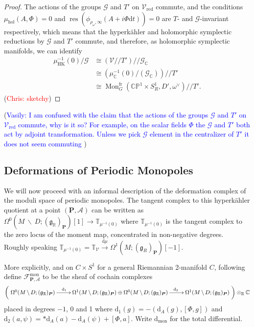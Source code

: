 \documentclass[11pt, oneside, reqno]{amsart}
\theoremstyle{definition} \newtheorem{definition}{Definition}[section]
\theoremstyle{definition} \newtheorem{remark}[definition]{Remark}
\theoremstyle{definition} \newtheorem{remarks}[definition]{Remarks}
\theoremstyle{definition} \newtheorem{question}[definition]{Question}
\theoremstyle{definition} \newtheorem*{note}{Note}
\theoremstyle{definition} \newtheorem{example}[definition]{Example}
\theoremstyle{definition} \newtheorem{examples}[definition]{Examples}
\renewcommand{\gg}{\mathfrak{g}}
\newcommand{\bb}[1]{\mathbb{#1}}
\newcommand{\mr}[1]{\mathrm{#1}}
\newcommand{\mc}[1]{\mathcal{#1}}
\newcommand{\bo}[1]{\boldsymbol{#1}}
\newcommand{\bs}{\ \backslash \ }
\newcommand{\CC}{\mathbb{C}}
\newcommand{\RR}{\mathbb{R}}
\newcommand{\iso}{\cong}
\DeclareMathOperator{\res}{res}
\DeclareMathOperator{\mon}{Mon}
\renewcommand{\d}{\mathrm{d}}
\newcommand{\fr}{\mathrm{fr}}
\newcommand{\chris}[1]{(\textcolor{red}{Chris: #1})}
\newcommand{\vasily}[1]{(\textcolor{blue}{Vasily: #1})}
\begin{document}
\begin{proof}
The actions of the groups $\mc G$ and $T'$ on $\mc V_{\mr{red}}$ commute, and the conditions $\mu_{\mr{hol}}(A,\Phi) = 0$ and $\res(\phi_{\rho_\omega, \infty}(A + i \Phi \d t)) = 0$ are $T$- and $\mc G$-invariant respectively, which means that the hyperk\"ahler and holomorphic symplectic reductions by $\mc G$ and $T'$ commute, and therefore, as holomorphic symplectic manifolds, we can identify
\begin{align*}
\mu_{\mr{HK}}^{-1}(0)/\mc G &\iso (\mc V/\!/ T') /\!/ \mc G_\CC \\
&\iso \left( \mu_{\CC}^{-1}(0)/(\mc G_\CC) \right) /\!/ T' \\
&\iso \mon^\fr_G(\bb{CP}^1 \times S^1_R, D', \omega^\vee) /\!/ T'.
\end{align*}
\chris{sketchy}
\end{proof}
\vasily{I am confused with the claim that the actions of the groups
  $\mathcal{G}$ and $T'$ on $\mc V_{\mr{red}}$ commute, why is it so?
  For example, on the scalar fields $\Phi$ the $\mathcal{G}$ and $T'$ both
  act by adjoint transformation. Unless we pick $\mathcal{G}$ element
in the centralizer of $T'$ it does not seem commuting }


\subsection{Deformations of Periodic Monopoles} \label{monopole_def_section}
We will now proceed with an informal description of the deformation complex of the moduli space of periodic monopoles.  The tangent complex to this hyperk\"ahler quotient at a point $(\bo P, \mc A)$ can be written as $\Omega^0(M \!\bs\! D; (\gg_\RR)_{\bo P})[1] \to \bb T_{\mu^{-1}(0)}$ where $\bb T_{\mu^{-1}(0)}$ is the tangent complex to the zero locus of the moment map, concentrated in non-negative degrees. Roughly speaking $\bb T_{\mu^{-1}(0)} = \bb T_{\mc V} \overset {\d\mu} \to \Omega^1(M; (\gg_R)_{\bo P})[-1]$.  

More explicitly, and on $C \times S^1$ for a general Riemannian 2-manifold $C$, following \cite{FoscoloDef} define $\mc F^{\mr{mon}}_{\bo P, \mc A}$ to be the sheaf of cochain complexes
\[\left(\xymatrix{
\Omega^0(M \!\bs\! D; (\gg_\RR)_{\bo P}) \ar[r]^(.36){\d_1} &\Omega^1(M \!\bs\! D; (\gg_\RR)_{\bo P}) \oplus \Omega^0(M \!\bs\! D; (\gg_\RR)_{\bo P}) \ar[r]^(.64){\d_2} &\Omega^1(M \!\bs\! D; (\gg_\RR)_{\bo P})
}\right) \otimes_\RR \CC\]
placed in degrees $-1$, 0 and 1 where $\d_1(g) = -(\d_A(g),[\Phi, g])$ and $\d_2(a,\psi) = \ast \d_A(a) - \d_A(\psi) + [\Phi,a]$.  Write $\d_{\mr{mon}}$ for the total differential.
  
\end{document}
